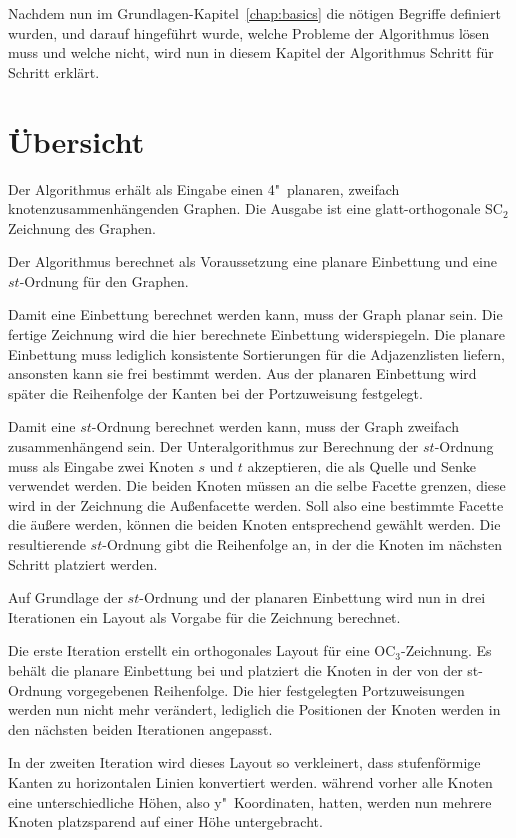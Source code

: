 \documentclass[a4paper]{scrreprt}
\theoremstyle{definition}
\begin{document}
Nachdem nun im Grundlagen-Kapitel~\ref{chap:basics} die nötigen Begriffe definiert wurden, und darauf hingeführt wurde, welche Probleme der Algorithmus lösen muss und welche nicht, wird nun in diesem Kapitel der Algorithmus Schritt für Schritt erklärt.

\section{Übersicht}

Der Algorithmus erhält als Eingabe einen 4"~planaren, zweifach knotenzusammenhängenden Graphen. Die Ausgabe ist eine glatt-orthogonale SC$_2$ Zeichnung des Graphen.

Der Algorithmus berechnet als Voraussetzung eine planare Einbettung und eine $st$-Ordnung für den Graphen.

Damit eine Einbettung berechnet werden kann, muss der Graph planar sein. Die fertige Zeichnung wird die hier berechnete Einbettung widerspiegeln. Die planare Einbettung muss lediglich konsistente Sortierungen für die Adjazenzlisten liefern, ansonsten kann sie frei bestimmt werden. Aus der planaren Einbettung wird später die Reihenfolge der Kanten bei der Portzuweisung festgelegt.

Damit eine $st$-Ordnung berechnet werden kann, muss der Graph zweifach zusammenhängend sein. Der Unteralgorithmus zur Berechnung der $st$-Ordnung muss als Eingabe zwei Knoten $s$ und $t$ akzeptieren, die als Quelle und Senke verwendet werden. Die beiden Knoten müssen an die selbe Facette grenzen, diese wird in der Zeichnung die Außenfacette werden. Soll also eine bestimmte Facette die äußere werden, können die beiden Knoten entsprechend gewählt werden. Die resultierende $st$-Ordnung gibt die Reihenfolge an, in der die Knoten im nächsten Schritt platziert werden.

Auf Grundlage der $st$-Ordnung und der planaren Einbettung wird nun in drei Iterationen ein Layout als Vorgabe für die Zeichnung berechnet. 

Die erste Iteration erstellt ein orthogonales Layout für eine OC$_3$-Zeichnung. Es behält die planare Einbettung bei und platziert die Knoten in der von der st-Ordnung vorgegebenen Reihenfolge. Die hier festgelegten Portzuweisungen werden nun nicht mehr verändert, lediglich die Positionen der Knoten werden in den nächsten beiden Iterationen angepasst.

In der zweiten Iteration wird dieses Layout so verkleinert, dass stufenförmige Kanten zu horizontalen Linien konvertiert werden. während vorher alle Knoten eine unterschiedliche Höhen, also y"~Koordinaten, hatten, werden nun mehrere Knoten platzsparend auf einer Höhe untergebracht.
\end{document}
